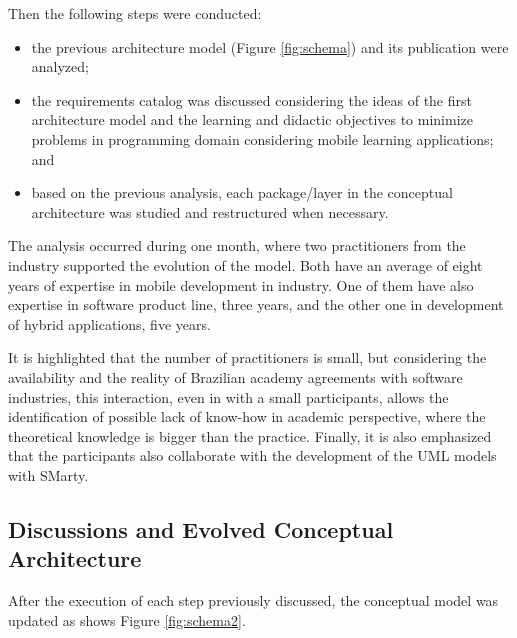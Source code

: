 Then the following steps were conducted:

\begin{itemize}
\item the previous architecture model (Figure \ref{fig:schema}) and its publication were analyzed;
\item the requirements catalog was discussed considering the ideas of the first architecture model and the learning and didactic objectives to minimize problems \cite{souza2015} in programming domain considering mobile learning applications; and
\item based on the previous analysis, each package/layer in the conceptual architecture was studied and restructured when necessary.
\end{itemize}

The analysis occurred during one month, where two practitioners from the industry supported the evolution of the model. Both have an average of eight years of expertise in mobile development in industry. One of them have also expertise in software product line, three years, and the other one in development of hybrid applications, five years.

It is highlighted that the number of practitioners is small, but considering the availability and the reality of Brazilian academy agreements with software industries, this interaction, even in with a small participants, allows the identification of possible lack of know-how in academic perspective, where the theoretical knowledge is bigger than the practice. Finally, it is also emphasized that the participants also collaborate with the development of the UML models with SMarty.

\subsection{Discussions and Evolved Conceptual Architecture}

After the execution of each step previously discussed, the conceptual model was updated as shows Figure \ref{fig:schema2}.


